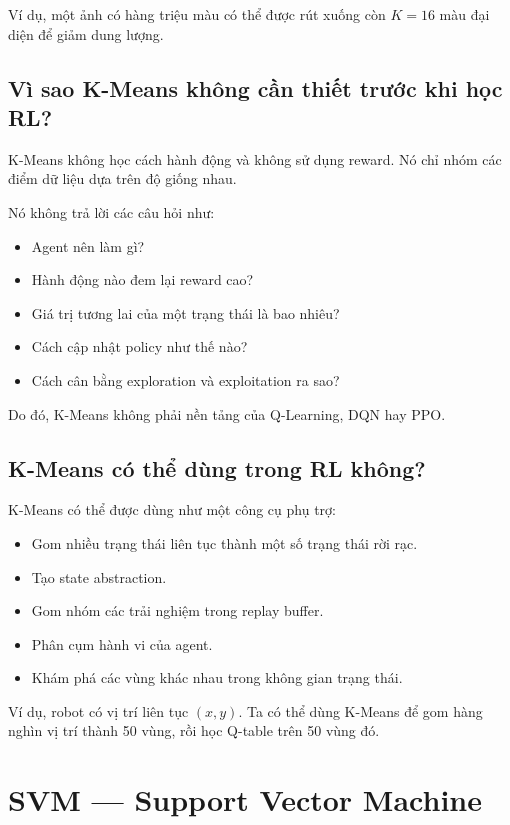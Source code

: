 \documentclass[12pt,a4paper]{report}
\begin{document}
Ví dụ, một ảnh có hàng triệu màu có thể được rút xuống còn \(K=16\) màu đại diện để giảm dung lượng.

\subsection{Vì sao K-Means không cần thiết trước khi học RL?}

K-Means không học cách hành động và không sử dụng reward. Nó chỉ nhóm các điểm dữ liệu dựa trên độ giống nhau.

Nó không trả lời các câu hỏi như:

\begin{itemize}[leftmargin=1.5em]
    \item Agent nên làm gì?
    \item Hành động nào đem lại reward cao?
    \item Giá trị tương lai của một trạng thái là bao nhiêu?
    \item Cách cập nhật policy như thế nào?
    \item Cách cân bằng exploration và exploitation ra sao?
\end{itemize}

Do đó, K-Means không phải nền tảng của Q-Learning, DQN hay PPO.

\subsection{K-Means có thể dùng trong RL không?}

K-Means có thể được dùng như một công cụ phụ trợ:

\begin{itemize}[leftmargin=1.5em]
    \item Gom nhiều trạng thái liên tục thành một số trạng thái rời rạc.
    \item Tạo state abstraction.
    \item Gom nhóm các trải nghiệm trong replay buffer.
    \item Phân cụm hành vi của agent.
    \item Khám phá các vùng khác nhau trong không gian trạng thái.
\end{itemize}

Ví dụ, robot có vị trí liên tục \((x,y)\). Ta có thể dùng K-Means để gom hàng nghìn vị trí thành 50 vùng, rồi học Q-table trên 50 vùng đó.

\section{SVM --- Support Vector Machine}
\end{document}
